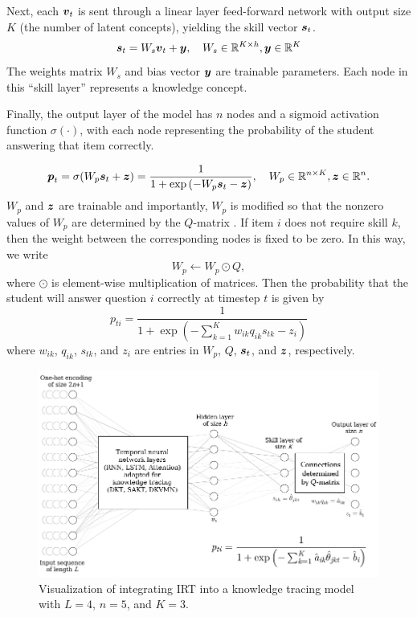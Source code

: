 Next, each $\boldsymbol{v}_t$ is sent through a linear layer feed-forward network with output size $K$ (the number of latent concepts), yielding the skill vector $\boldsymbol{s}_t$.
\begin{equation}
  \boldsymbol{s}_t = W_s \boldsymbol{v}_t + \boldsymbol{y}, \quad W_s \in \mathbb{R}^{K\times h}, \boldsymbol{y} \in \mathbb{R}^K
  \label{eq:skill_layer}
\end{equation}
The weights matrix $W_s$ and bias vector $\boldsymbol{y}$ are trainable parameters. Each node in this ``skill layer'' represents a knowledge concept.

Finally, the output layer of the model has $n$ nodes and a sigmoid activation function $\sigma(\cdot)$, with each node representing the probability of the student answering that item correctly.

\begin{equation}
  \boldsymbol{p}_t = \sigma(W_p \boldsymbol{s}_t + \boldsymbol{z}) = \frac{1}{1 + \exp \left( -W_p \boldsymbol{s}_t - \boldsymbol{z} \right)}, \quad W_p \in \mathbb{R}^{n \times K}, \boldsymbol{z} \in \mathbb{R}^n.
  \label{eq:pred_layer}
\end{equation}
$W_p$ and $\boldsymbol{z}$ are trainable and importantly, $W_p$ is modified so that the nonzero values of $W_p$ are determined by the $Q$-matrix \cite{guo2017}\cite{ijcnn_paper}. If item $i$ does not require skill $k$, then the weight between the corresponding nodes is fixed to be zero. In this way, we write
\begin{equation}
  W_p \gets W_p \odot Q,
  \label{eq:weight_constraint}
\end{equation}
where $\odot$ is element-wise multiplication of matrices. Then the probability that the student will answer question $i$ correctly at timestep $t$ is given by 
\begin{equation}
  p_{ti} = \frac{1}{1 + \exp\left( -\sum_{k=1}^K w_{ik} q_{ik} s_{tk} - z_i \right)}
  \label{eq:nn_out}
\end{equation}
where $w_{ik}$, $q_{ik}$, $s_{tk}$, and $z_i$ are entries in $W_p$, $Q$, $\boldsymbol{s}_t$, and $\boldsymbol{z}$, respectively.

\begin{figure}[h]
  \centering
  \includegraphics[width=.95\textwidth]{img/kt_irt/kt_irt_visual_with_equation_2.png}
  \caption{Visualization of integrating IRT into a knowledge tracing model with $L=4$, $n=5$, and $K=3$.}
  \label{fig:kt_irt_visual}
\end{figure}

